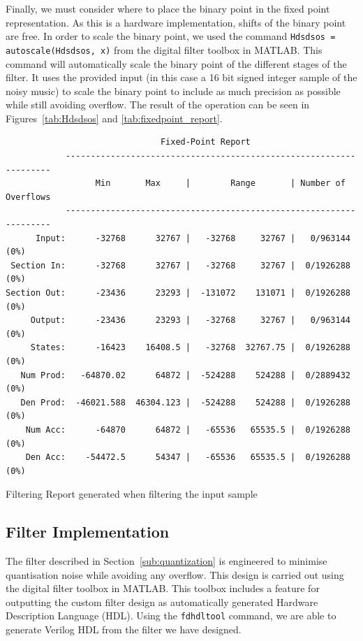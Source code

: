 \documentclass[]{article}
\begin{document}
Finally, we must consider where to place the binary point in the fixed point representation. As this is a hardware implementation, shifts of the binary point are free. In order to scale the binary point, we used the command \verb"Hdsdsos = autoscale(Hdsdsos, x)" from the digital filter toolbox in MATLAB.
This command will automatically scale the binary point of the different stages of the filter. It uses the provided input (in this case a 16 bit signed integer sample of the noisy music) to scale the binary point to include as much precision as possible while still avoiding overflow. The result of the operation can be seen in Figures~\ref{tab:Hdsdsos} and \ref{tab:fixedpoint_report}.

\begin{table}[tbp]
	\begin{center}
		\begin{lstlisting}
                               Fixed-Point Report                                          
            -------------------------------------------------------------------
                  Min       Max     |        Range       | Number of Overflows
            -------------------------------------------------------------------
      Input:      -32768      32767 |   -32768     32767 |   0/963144 (0%)
 Section In:      -32768      32767 |   -32768     32767 |  0/1926288 (0%)
Section Out:      -23436      23293 |  -131072    131071 |  0/1926288 (0%)
     Output:      -23436      23293 |   -32768     32767 |   0/963144 (0%)
     States:      -16423    16408.5 |   -32768  32767.75 |  0/1926288 (0%)
   Num Prod:   -64870.02      64872 |  -524288    524288 |  0/2889432 (0%)
   Den Prod:  -46021.588  46304.123 |  -524288    524288 |  0/1926288 (0%)
    Num Acc:      -64870      64872 |   -65536   65535.5 |  0/1926288 (0%)
    Den Acc:    -54472.5      54347 |   -65536   65535.5 |  0/1926288 (0%)
		\end{lstlisting}
	\end{center}
	\caption{Filtering Report generated when filtering the input sample}
	\label{tab:fixedpoint_report}
\end{table}



\subsection{Filter Implementation} %
\label{sub:filter_implementation}

The filter described in Section~\ref{sub:quantization} is engineered to minimise quantisation noise while avoiding any overflow. This design is carried out using the digital filter toolbox in MATLAB.
This toolbox includes a feature for outputting the custom filter design as automatically generated Hardware Description Language (HDL).
Using the \verb"fdhdltool" command, we are able to generate Verilog HDL from the filter we have designed.
\end{document}
